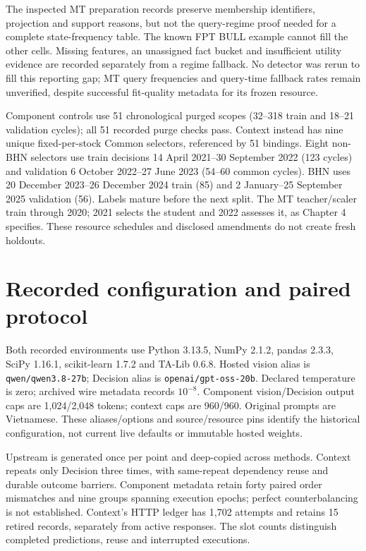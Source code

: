 The inspected MT preparation records preserve membership identifiers,
projection and support reasons, but not the query-regime proof needed
for a complete state-frequency table. The known FPT BULL example cannot
fill the other cells. Missing features, an unassigned fact bucket and insufficient utility evidence are recorded separately from a regime fallback.
No detector was rerun to fill this reporting gap; MT query frequencies
and query-time fallback rates remain unverified, despite successful
fit-quality metadata for its frozen resource.

Component controls use 51 chronological purged scopes (32--318 train and
18--21 validation cycles); all 51 recorded purge checks pass. Context
instead has nine unique fixed-per-stock Common selectors, referenced by
51 bindings. Eight non-BHN selectors use train decisions 14 April
2021--30 September 2022 (123 cycles) and validation 6 October 2022--27 June
2023 (54--60 common cycles). BHN uses 20 December 2023--26 December 2024
train (85) and 2 January--25 September 2025 validation (56). Labels mature
before the next split. The MT teacher/scaler train through 2020; 2021
selects the student and 2022 assesses it, as Chapter 4 specifies. These
resource schedules and disclosed amendments do not create fresh holdouts.

\section{Recorded configuration and paired protocol}\label{s:21f290190e1fcedc}
Both recorded environments use Python 3.13.5, NumPy 2.1.2, pandas 2.3.3,
SciPy 1.16.1, scikit-learn 1.7.2 and TA-Lib 0.6.8. Hosted vision alias is
\texttt{qwen/qwen3.8-27b}; Decision alias is \texttt{openai/gpt-oss-20b}.
Declared temperature is zero; archived wire metadata records $10^{-8}$.
Component vision/Decision output caps are 1,024/2,048 tokens; context caps
are 960/960. Original prompts are Vietnamese. These aliases/options and
source/resource pins identify the historical configuration, not current
live defaults or immutable hosted weights.

Upstream is generated once per point and deep-copied across methods.
Context repeats only Decision three times, with same-repeat dependency
reuse and durable outcome barriers. Component metadata retain forty
paired order mismatches and nine groups spanning execution epochs;
perfect counterbalancing is not established. Context's HTTP ledger has
1,702 attempts and retains 15 retired records, separately from active
responses. The slot counts distinguish completed predictions, reuse and interrupted executions.

